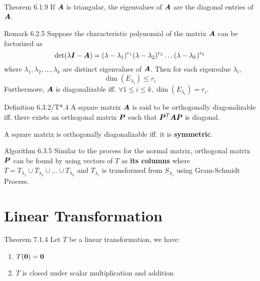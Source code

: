 \documentclass[10pt,portrait]{article}
\begin{document}
\begin{multicols}{2}
\begin{justifying}
\begin{namedthm*}{Theorem 6.1.9}
	If \(\bm{A}\) is triangular, the eigenvalues of \(\bm{A}\) are the diagonal entries of \(\bm{A}\).
\end{namedthm*}

\begin{namedthm*}{Remark 6.2.5}
	Suppose the characteristic polynomial of the matrix \(\bm{A}\) can be factorized as
	\[
	    \det(\lambda\bm{I} - \bm{A}) = (\lambda - \lambda_1)^{r_1}(\lambda - \lambda_2)^{r_2}\dots(\lambda - \lambda_k)^{r_k}
	\]
	where \(\lambda_1, \lambda_2, \dots, \lambda_k\) are distinct eigenvalues of \(\bm{A}\). Then for each eigenvalue \(\lambda_i\), 
	\[
	    \dim(E_{\lambda_i}) \le r_i
	\]
	Furthermore, \(\bm{A}\) is diagonalizable iff. \(\forall 1 \le i \le k, \dim(E_{\lambda_i}) = r_i\).
\end{namedthm*}

\begin{namedthm*}{Definition 6.3.2/T*.4}
	A square matrix \(\bm{A}\) is said to be orthogonally diagonalizable iff. there exists an orthogonal matrix \(\bm{P}\) such that \(\bm{P}^T\bm{A}\bm{P}\) is diagonal.
	
	A square matrix is orthogonally diagonalizable iff. it is \textbf{symmetric}.
\end{namedthm*}

\begin{namedthm*}{Algorithm 6.3.5}
	Similar to the process for the normal matrix, orthogonal matrix \(\bm{P}\) can be found by using vectors of \(T\) as \textbf{its columns} where \(T = T_{\lambda_1} \cup T_{\lambda_2} \cup \dots \cup T_{\lambda_k}\) and \(T_{\lambda_i}\) is transformed from \(S_{\lambda_1}\) using Gram-Schmidt Process.
\end{namedthm*}

\section{Linear Transformation}

\begin{namedthm*}{Theorem 7.1.4}
	Let \(T\) be a linear transformation, we have:
	\begin{enumerate}
		\item \(T(\bm{0}) = \bm{0}\)
		\item \(T\) is closed under scalar multiplication and addition
	\end{enumerate}
\end{namedthm*}


\end{justifying}
\end{multicols}
\end{document}
